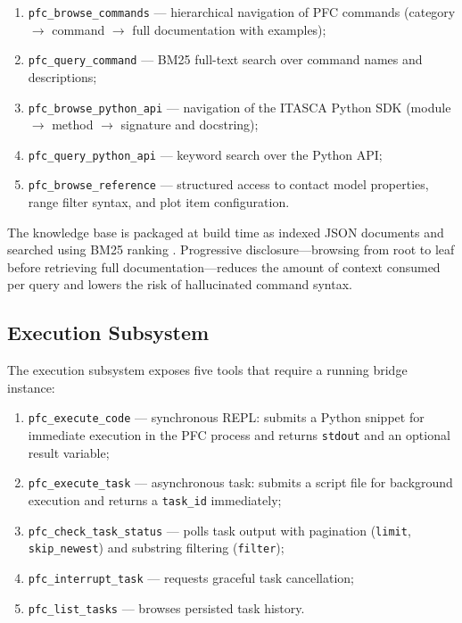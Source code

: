 \begin{enumerate}
  \item \texttt{pfc\_browse\_commands} — hierarchical navigation of PFC commands (category $\to$ command $\to$ full documentation with examples);
  \item \texttt{pfc\_query\_command} — BM25 full-text search over command names and descriptions;
  \item \texttt{pfc\_browse\_python\_api} — navigation of the ITASCA Python SDK (module $\to$ method $\to$ signature and docstring);
  \item \texttt{pfc\_query\_python\_api} — keyword search over the Python API;
  \item \texttt{pfc\_browse\_reference} — structured access to contact model properties, range filter syntax, and plot item configuration.
\end{enumerate}

The knowledge base is packaged at build time as indexed JSON documents and searched using BM25 ranking \citep{Robertson1994}. Progressive disclosure---browsing from root to leaf before retrieving full documentation---reduces the amount of context consumed per query and lowers the risk of hallucinated command syntax.

\subsection{Execution Subsystem}
\label{sec:design:execution}


The execution subsystem exposes five tools that require a running bridge instance:

\begin{enumerate}
  \item \texttt{pfc\_execute\_code} — synchronous REPL: submits a Python snippet for immediate execution in the PFC process and returns \texttt{stdout} and an optional result variable;
  \item \texttt{pfc\_execute\_task} — asynchronous task: submits a script file for background execution and returns a \texttt{task\_id} immediately;
  \item \texttt{pfc\_check\_task\_status} — polls task output with pagination (\texttt{limit}, \texttt{skip\_newest}) and substring filtering (\texttt{filter});
  \item \texttt{pfc\_interrupt\_task} — requests graceful task cancellation;
  \item \texttt{pfc\_list\_tasks} — browses persisted task history.
\end{enumerate}


